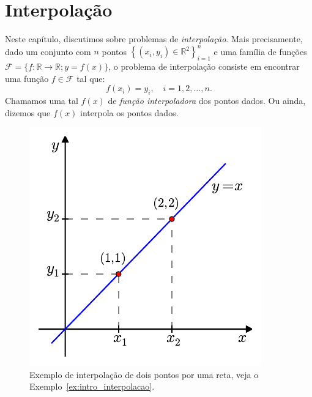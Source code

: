 
%

\chapter{Interpolação}

Neste capítulo, discutimos sobre problemas de \emph{interpolação}. Mais precisamente, dado um conjunto com $n$ pontos $\left\{(x_i, y_i)\in \mathbb{R}^2\right\}_{i=1}^n$ e uma família de funções $\mathcal{F} = \{f:\mathbb{R}\to\mathbb{R}; y = f(x)\}$, o problema de interpolação consiste em encontrar uma função $f\in\mathcal{F}$ tal que:
\begin{equation*}
  f(x_i) = y_i,\quad i=1, 2, \dotsc, n.
\end{equation*}
Chamamos uma tal $f(x)$ de \emph{função interpoladora} dos pontos dados. Ou ainda, dizemos que $f(x)$ interpola os pontos dados.

\begin{figure}
  \centering
  \includegraphics[scale=0.9]{./cap_interp/pics/ex_intro_interpolacao/ex_intro_interpolacao}
  \caption{Exemplo de interpolação de dois pontos por uma reta, veja o Exemplo~\ref{ex:intro_interpolacao}.}\label{fig:ex_intro_interp}
\end{figure}

